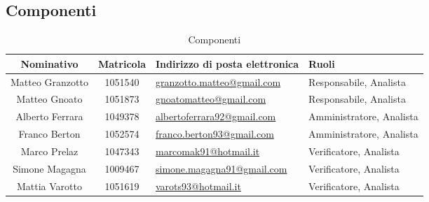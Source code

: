 \subsection{Componenti}
\begin{table}[H]
	\begin{center}
		\setlength{\extrarowheight}{\jot}
		\begin{tabular}{|c|c|p{5cm}|p{4.3cm}|}
			\hline
			\textbf{Nominativo} & \textbf{Matricola} & \raggedright \textbf{Indirizzo di posta elettronica} & \textbf{Ruoli} \\[1ex]
			\hline
	 		Matteo Granzotto	& 1051540	& \href{mailto:granzotto.matteo@gmail.com}{granzotto.matteo@gmail.com} 	& Responsabile, Analista 	\\[1ex]
			\hline
			Matteo Gnoato		& 1051873	& \href{mailto:gnoatomatteo@gmail.com}{gnoatomatteo@gmail.com} 			& Responsabile, Analista 	\\[1ex]
			\hline
			Alberto Ferrara		& 1049378	& \href{mailto:albertoferrara92@gmail.com}{albertoferrara92@gmail.com} 	& Amministratore, Analista 	\\[1ex]
			\hline
			Franco Berton 		& 1052574	& \href{mailto:franco.berton93@gmail.com}{franco.berton93@gmail.com} 	& Amministratore, Analista	\\[1ex]
			\hline
			Marco Prelaz		& 1047343	& \href{mailto:marcomak91@hotmail.it}{marcomak91@hotmail.it} 			& Verificatore, Analista	\\[1ex]
			\hline
			Simone Magagna		& 1009467	& \href{mailto:simone.magagna91@gmail.com}{simone.magagna91@gmail.com} 	& Verificatore, Analista 	\\[1ex]
			\hline
			Mattia Varotto		& 1051619	& \href{mailto:varots93@hotmail.it}{varots93@hotmail.it} & Verificatore, Analista \\[1ex]
			\hline	
		\end{tabular}
	\end{center}
	\caption{Componenti}
\end{table}

